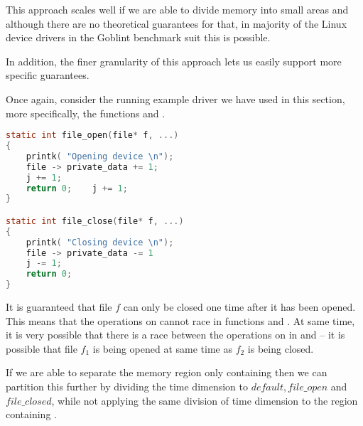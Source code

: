 \documentclass[..thesis.tex]{subfiles}
\begin{document}
This approach scales well if we are able to divide memory into small areas and although there are no theoretical guarantees for that,
in majority of the Linux device drivers in the Goblint benchmark suit this is possible.



In addition, the finer granularity of this approach lets us easily support more specific guarantees.

Once again, consider the running example driver we have used in this section, more specifically, the functions  and .

\begin{lstlisting}[language=c,style=def]
static int file_open(file* f, ...)
{
    printk( "Opening device \n");
    file -> private_data += 1;
    j += 1;
    return 0;    j += 1;
}

static int file_close(file* f, ...)
{
    printk( "Closing device \n");
    file -> private_data -= 1
    j -= 1;
    return 0;
}
\end{lstlisting}

It is guaranteed that file $f$ can only be closed one time after it has been opened. This means that the operations on 
cannot race in functions  and . At same time, it is very possible that there is a race between the operations on  in  and 
-- it is possible that file $f_1$ is being opened at same time as $f_2$ is being closed. 

If we are able to separate the memory region only containing  then we can partition this further by dividing the time dimension to $default, file\_open$ and $file\_closed$,
while not applying the same division of time dimension to the region containing . 
\end{document}
